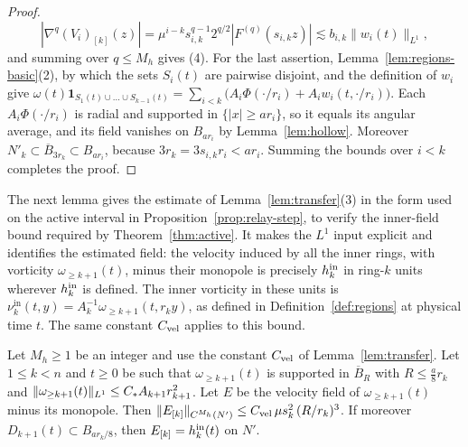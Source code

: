 \begin{proof}
\[
|\nabla^q(V_i)_{[k]}(z)|=\mu^{i-k}s_{i,k}^{q-1}2^{q/2}|F^{(q)}(s_{i,k}z)|
\lesssim b_{i,k}\|w_i(t)\|_{L^1},
\]
and summing over $q\le M_h$ gives (4). For the last
assertion, Lemma~\ref{lem:regions-basic}(2), by which the sets $S_i(t)$ are
pairwise disjoint, and the definition of $w_i$ give
$\omega(t)\mathbf 1_{S_1(t)\cup\dots\cup S_{k-1}(t)}=\sum_{i<k}\big(A_i\Phi(\cdot/r_i)+A_iw_i(t,\cdot/r_i)\big)$.
Each $A_i\Phi(\cdot/r_i)$ is radial and supported in $\{|x|\ge ar_i\}$, so it
equals its angular average, and its field vanishes on $B_{ar_i}$ by
Lemma~\ref{lem:hollow}. Moreover
$N'_k\subset\overline B_{3r_k}\subset B_{ar_i}$, because $3r_k=3s_{i,k}r_i<ar_i$.
Summing the bounds over $i<k$ completes the proof.
\end{proof}

The next lemma gives the estimate of Lemma~\ref{lem:transfer}(3) in the form
used on the active interval in Proposition~\ref{prop:relay-step}, to verify the
inner-field bound required by Theorem~\ref{thm:active}. It makes the $L^1$
input explicit and identifies the estimated field: the velocity induced by
all the inner rings, with vorticity $\omega_{\ge k+1}(t)$, minus their monopole
is precisely $h^{\mathrm{in}}_k$ in ring-$k$ units wherever $h^{\mathrm{in}}_k$ is defined. The
inner vorticity in these units is
$\nu^{\mathrm{in}}_k(t,y)=A_k^{-1}\omega_{\ge k+1}(t,r_ky)$, as defined in
Definition~\ref{def:regions} at physical time $t$. The
same constant $C_{\mathrm{vel}}$ applies to this bound.

\begin{lemma}
\label{lem:inner-field}
Let $M_h\ge1$ be an integer and use the constant $C_{\mathrm{vel}}$ of
Lemma~\ref{lem:transfer}. Let $1\le k<n$ and $t\ge0$ be such that
$\omega_{\ge k+1}(t)$ is supported in $\overline B_R$ with $R\le\frac a8r_k$ and
$\|\omega_{\ge k+1}(t)\|_{L^1}\le C_{*} A_{k+1}r_{k+1}^2$. Let $E$ be the
velocity field of $\omega_{\ge k+1}(t)$ minus its monopole. Then
$\|E_{[k]}\|_{C^{M_h}(N')}\le C_{\mathrm{vel}}\,\mu s_k^2\,(R/r_k)^3$. If moreover
$D_{k+1}(t)\subset B_{ar_k/8}$, then $E_{[k]}=h^{\mathrm{in}}_k(t)$ on $N'$.
\end{lemma}

